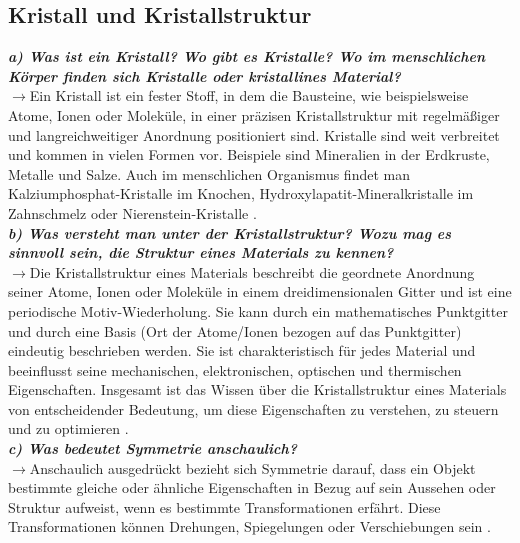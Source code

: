 \subsection{\label{subsec:FZV4}Kristall und Kristallstruktur}
\textbf{\textit{a) Was ist ein Kristall? Wo gibt es Kristalle? Wo im menschlichen Körper
finden sich Kristalle oder kristallines Material?}}\\
$\rightarrow$Ein Kristall ist ein fester Stoff, in dem die Bausteine, wie beispielsweise Atome, Ionen oder Moleküle, 
in einer präzisen Kristallstruktur mit regelmäßiger und langreichweitiger Anordnung positioniert sind. Kristalle sind weit verbreitet 
und kommen in vielen Formen vor. Beispiele sind Mineralien in der Erdkruste, Metalle und Salze. 
Auch im menschlichen Organismus findet man Kalziumphosphat-Kristalle im Knochen, 
Hydroxylapatit-Mineralkristalle im Zahnschmelz
oder Nierenstein-Kristalle \cite{Schwarz, EPC}. \\  

\textbf{\textit{b) Was versteht man unter der Kristallstruktur? Wozu mag es sinnvoll sein,
die Struktur eines Materials zu kennen?}}\\
$\rightarrow$Die Kristallstruktur eines Materials beschreibt die geordnete Anordnung seiner Atome, 
Ionen oder Moleküle in einem dreidimensionalen Gitter und ist eine periodische Motiv-Wiederholung. 
Sie kann durch ein mathematisches Punktgitter und
durch eine Basis (Ort der Atome/Ionen bezogen auf das Punktgitter) eindeutig beschrieben werden.
Sie ist charakteristisch für jedes Material und beeinflusst seine mechanischen, elektronischen, 
optischen und thermischen Eigenschaften. Insgesamt ist das Wissen über die Kristallstruktur eines Materials 
von entscheidender Bedeutung, um diese Eigenschaften zu verstehen, zu steuern und zu optimieren \cite{Schwarz, EPC}. \\

\textbf{\textit{c) Was bedeutet Symmetrie anschaulich?}}\\
$\rightarrow$Anschaulich ausgedrückt bezieht sich Symmetrie darauf, dass ein Objekt 
bestimmte gleiche oder ähnliche Eigenschaften in Bezug auf sein Aussehen oder Struktur aufweist, 
wenn es bestimmte Transformationen erfährt. 
Diese Transformationen können Drehungen, Spiegelungen oder Verschiebungen sein \cite{Schwarz}.\\

